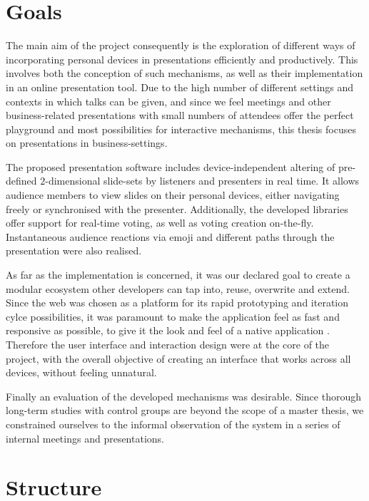 \section{Goals}

The main aim of the project consequently is the exploration of different ways of incorporating personal devices in presentations efficiently and productively. This involves both the conception of such mechanisms, as well as their implementation in an online presentation tool.
Due to the high number of different settings and contexts in which talks can be given, and since we feel meetings and other business-related presentations with small numbers of attendees offer the perfect playground and most possibilities for interactive mechanisms, this thesis focuses on presentations in business-settings.

The proposed presentation software includes device-independent altering of pre-defined $2$-dimensional slide-sets by listeners and presenters in real time. It allows audience members to view slides on their personal devices, either navigating freely or synchronised with the presenter. Additionally, the developed libraries offer support for real-time voting, as well as voting creation on-the-fly. Instantaneous audience reactions via emoji and different paths through the presentation were also realised.

As far as the implementation is concerned, it was our declared goal to create a modular ecosystem other developers can tap into, reuse, overwrite and extend. Since the web was chosen as a platform for its rapid prototyping and iteration cylce possibilities, it was paramount to make the application feel as fast and responsive as possible, to give it the look and feel of a native application \cite{Charland:WebVsNative}. Therefore the user interface and interaction design were at the core of the project, with the overall objective of creating an interface that works across all devices, without feeling unnatural.

Finally an evaluation of the developed mechanisms was desirable. Since thorough long-term studies with control groups are beyond the scope of a master thesis, we constrained ourselves to the informal observation of the system in a series of internal meetings and presentations.

\section{Structure}

